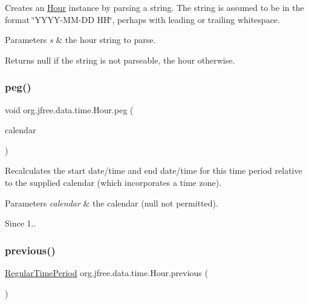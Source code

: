 Creates an \mbox{\hyperlink{classorg_1_1jfree_1_1data_1_1time_1_1_hour}{Hour}} instance by parsing a string. The string is assumed to be in the format \char`\"{}\+Y\+Y\+Y\+Y-\/\+M\+M-\/\+D\+D H\+H\char`\"{}, perhaps with leading or trailing whitespace.


\begin{DoxyParams}{Parameters}
{\em s} & the hour string to parse.\\
\hline
\end{DoxyParams}
\begin{DoxyReturn}{Returns}
{\ttfamily null} if the string is not parseable, the hour otherwise. 
\end{DoxyReturn}
\mbox{\label{classorg_1_1jfree_1_1data_1_1time_1_1_hour_af4edfe009983a54b3747e191fcdb59e6}} 
\subsubsection{\texorpdfstring{peg()}{peg()}}
{\footnotesize\ttfamily void org.\+jfree.\+data.\+time.\+Hour.\+peg (\begin{DoxyParamCaption}\item[{Calendar}]{calendar }\end{DoxyParamCaption})}

Recalculates the start date/time and end date/time for this time period relative to the supplied calendar (which incorporates a time zone).


\begin{DoxyParams}{Parameters}
{\em calendar} & the calendar ({\ttfamily null} not permitted).\\
\hline
\end{DoxyParams}
\begin{DoxySince}{Since}
1.. 
\end{DoxySince}
\mbox{\label{classorg_1_1jfree_1_1data_1_1time_1_1_hour_a13971eb4e9c3744f1a104195b4611105}} 
\subsubsection{\texorpdfstring{previous()}{previous()}}
{\footnotesize\ttfamily \mbox{\hyperlink{classorg_1_1jfree_1_1data_1_1time_1_1_regular_time_period}{Regular\+Time\+Period}} org.\+jfree.\+data.\+time.\+Hour.\+previous (\begin{DoxyParamCaption}{ }\end{DoxyParamCaption})}

